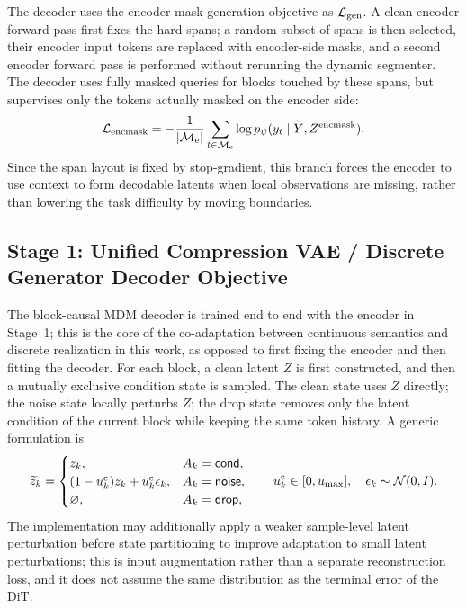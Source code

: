 The decoder uses the encoder-mask generation objective as $\mathcal{L}_{\mathrm{gen}}$. A clean encoder forward pass first fixes the hard spans; a random subset of spans is then selected, their encoder input tokens are replaced with encoder-side masks, and a second encoder forward pass is performed without rerunning the dynamic segmenter. The decoder uses fully masked queries for blocks touched by these spans, but supervises only the tokens actually masked on the encoder side:
\begin{equation}
    \mathcal{L}_{\mathrm{encmask}}
    =-\frac{1}{|\mathcal M_{\mathrm e}|}
      \sum_{t\in\mathcal M_{\mathrm e}}
      \log p_\psi(y_t\mid \widetilde Y,Z^{\mathrm{encmask}}).
    \label{eq:app-workflow-encmask}
\end{equation}
Since the span layout is fixed by stop-gradient, this branch forces the encoder to use context to form decodable latents when local observations are missing, rather than lowering the task difficulty by moving boundaries.

\subsection{Stage 1: Unified Compression VAE / Discrete Generator Decoder Objective}
\label{app:stage1-details}

The block-causal MDM decoder is trained end to end with the encoder in Stage~1; this is the core of the co-adaptation between continuous semantics and discrete realization in this work, as opposed to first fixing the encoder and then fitting the decoder. For each block, a clean latent $Z$ is first constructed, and then a mutually exclusive condition state is sampled. The clean state uses $Z$ directly; the noise state locally perturbs $Z$; the drop state removes only the latent condition of the current block while keeping the same token history. A generic formulation is
\begin{equation}
\widetilde z_k=
\begin{cases}
z_k,&A_k=\textsf{cond},\\
(1-u_k^{\mathrm c})z_k+u_k^{\mathrm c}\epsilon_k,
&A_k=\textsf{noise},\\
\varnothing,&A_k=\textsf{drop},
\end{cases}
\qquad
u_k^{\mathrm c}\in[0,u_{\max}],
\quad \epsilon_k\sim\mathcal{N}(0,I).
\label{eq:app-workflow-condition-state}
\end{equation}
The implementation may additionally apply a weaker sample-level latent perturbation before state partitioning to improve adaptation to small latent perturbations; this is input augmentation rather than a separate reconstruction loss, and it does not assume the same distribution as the terminal error of the DiT.

